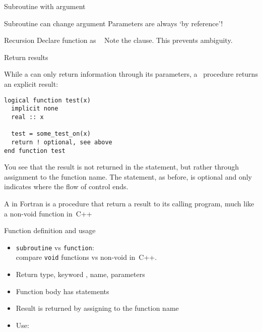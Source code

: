 \begin{block}{Subroutine with argument}
  \label{sl:fsubr-arg}
\end{block}

\begin{block}{Subroutine can change argument}
  \label{sl:fsubr-inout}
  Parameters are always `by reference'!
\end{block}

\begin{block}{Recursion}
  \label{sl:funcf:recursion}
  Declare function as ~
  Note the  clause. This prevents ambiguity.
\end{block}

 {Return results}

While a  can only return information through its parameters,
a~ procedure returns an explicit result:
\begin{lstlisting}
logical function test(x)
  implicit none
  real :: x

  test = some_test_on(x)
  return ! optional, see above
end function test
\end{lstlisting}
You see that the result is not returned in the  statement,
but rather through assignment to the function name. The 
statement, as before, is optional and only indicates where the flow of
control ends.

A  in Fortran is a procedure that return a
result to its calling program, much like a non-void function in~C++

\begin{block}{Function definition and usage}
  \label{sl:ffunction-def}
  \begin{itemize}
  \item \lstinline$subroutine$ vs \lstinline$function$:\\
    compare \lstinline$void$ functions vs non-void in~C++.
  \item Return type, keyword , name, parameters
  \item Function body has statements
  \item Result is returned by assigning to the function name
  \item Use: 
  \end{itemize}
\end{block}


